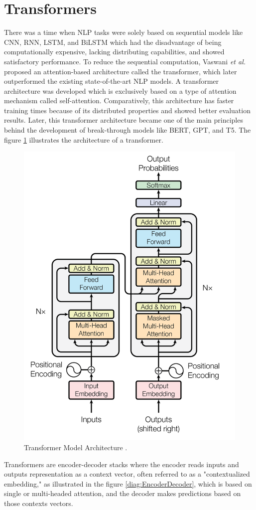\documentclass[%
	BCOR=8mm, %
	DIV=12,
	toc=bibliography, %
	toc=listof, %
	oneside, %
	egregdoesnotlikesansseriftitles, %
	]{scrbook}
\begin{document}
\section{Transformers}
\label{section: transformers}
There was a time when NLP tasks were solely based on sequential models like CNN, RNN, LSTM, and BiLSTM which had the disadvantage of being computationally expensive, lacking distributing capabilities, and showed satisfactory performance. To reduce the  sequential computation,  Vaswani \textit{et al.} \cite{vaswani_attention_2017} proposed an attention-based architecture called the transformer, which later outperformed the existing state-of-the-art NLP models. A transformer architecture was developed which is exclusively based on a type of attention mechanism called self-attention. Comparatively, this architecture has faster training times because of its distributed properties and showed better evaluation results. 
Later, this transformer architecture became one of the main principles behind the development of break-through models like BERT, GPT, and T5. The figure \ref{diag:TransformerArchitecture} illustrates the architecture of a transformer.
\begin{figure}[H]
    \centering
    \includegraphics[width=.50\textwidth]{img/TransformerArchitecture.png}
    \caption[Diagram of Transformer Architecture.]{Transformer Model Architecture \cite{vaswani_attention_2017}.}
    \label{diag:TransformerArchitecture}
\end{figure}
Transformers are encoder-decoder stacks where the encoder reads inputs and outputs representation as a context vector, often referred to as a "contextualized embedding," as illustrated in the figure \ref{diag:EncoderDecoder}, which is based on single or multi-headed attention, and the decoder makes predictions based on those contexts vectors.\\
\end{document}
